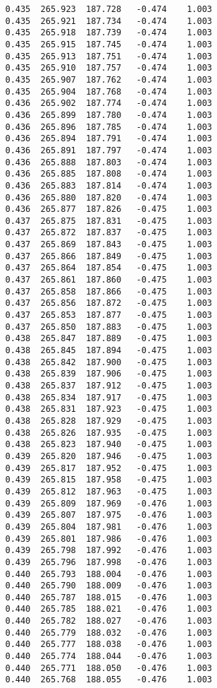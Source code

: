 \begin{verbatim}
   0.435  265.923  187.728   -0.474    1.003
   0.435  265.921  187.734   -0.474    1.003
   0.435  265.918  187.739   -0.474    1.003
   0.435  265.915  187.745   -0.474    1.003
   0.435  265.913  187.751   -0.474    1.003
   0.435  265.910  187.757   -0.474    1.003
   0.435  265.907  187.762   -0.474    1.003
   0.435  265.904  187.768   -0.474    1.003
   0.436  265.902  187.774   -0.474    1.003
   0.436  265.899  187.780   -0.474    1.003
   0.436  265.896  187.785   -0.474    1.003
   0.436  265.894  187.791   -0.474    1.003
   0.436  265.891  187.797   -0.474    1.003
   0.436  265.888  187.803   -0.474    1.003
   0.436  265.885  187.808   -0.474    1.003
   0.436  265.883  187.814   -0.474    1.003
   0.436  265.880  187.820   -0.474    1.003
   0.436  265.877  187.826   -0.475    1.003
   0.437  265.875  187.831   -0.475    1.003
   0.437  265.872  187.837   -0.475    1.003
   0.437  265.869  187.843   -0.475    1.003
   0.437  265.866  187.849   -0.475    1.003
   0.437  265.864  187.854   -0.475    1.003
   0.437  265.861  187.860   -0.475    1.003
   0.437  265.858  187.866   -0.475    1.003
   0.437  265.856  187.872   -0.475    1.003
   0.437  265.853  187.877   -0.475    1.003
   0.437  265.850  187.883   -0.475    1.003
   0.438  265.847  187.889   -0.475    1.003
   0.438  265.845  187.894   -0.475    1.003
   0.438  265.842  187.900   -0.475    1.003
   0.438  265.839  187.906   -0.475    1.003
   0.438  265.837  187.912   -0.475    1.003
   0.438  265.834  187.917   -0.475    1.003
   0.438  265.831  187.923   -0.475    1.003
   0.438  265.828  187.929   -0.475    1.003
   0.438  265.826  187.935   -0.475    1.003
   0.438  265.823  187.940   -0.475    1.003
   0.439  265.820  187.946   -0.475    1.003
   0.439  265.817  187.952   -0.475    1.003
   0.439  265.815  187.958   -0.475    1.003
   0.439  265.812  187.963   -0.475    1.003
   0.439  265.809  187.969   -0.476    1.003
   0.439  265.807  187.975   -0.476    1.003
   0.439  265.804  187.981   -0.476    1.003
   0.439  265.801  187.986   -0.476    1.003
   0.439  265.798  187.992   -0.476    1.003
   0.439  265.796  187.998   -0.476    1.003
   0.440  265.793  188.004   -0.476    1.003
   0.440  265.790  188.009   -0.476    1.003
   0.440  265.787  188.015   -0.476    1.003
   0.440  265.785  188.021   -0.476    1.003
   0.440  265.782  188.027   -0.476    1.003
   0.440  265.779  188.032   -0.476    1.003
   0.440  265.777  188.038   -0.476    1.003
   0.440  265.774  188.044   -0.476    1.003
   0.440  265.771  188.050   -0.476    1.003
   0.440  265.768  188.055   -0.476    1.003

\end{verbatim}
